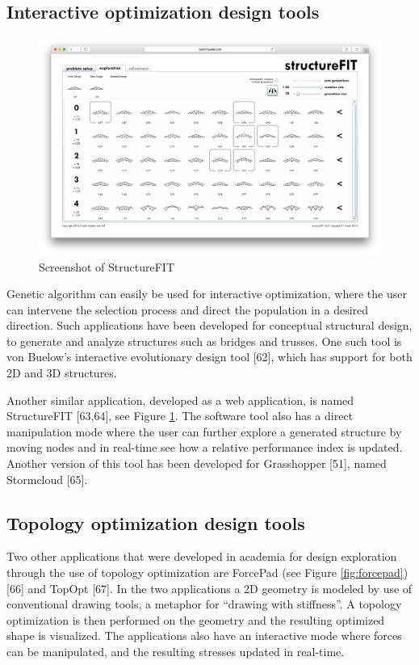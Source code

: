 \subsection{Interactive optimization design tools}

\begin{figure}
  \includegraphics[width=350pt]{graphics/structurefit.png}
  \caption{Screenshot of StructureFIT}
  \label{fig:structurefit}
\end{figure}

Genetic algorithm can easily be used for interactive optimization, where the user can intervene the selection process and direct the population in a desired direction. Such applications have been developed for conceptual structural design, to generate and analyze structures such as bridges and trusses. One such tool is von Buelow’s interactive evolutionary design tool [62], which has support for both 2D and 3D structures.

Another similar application, developed as a web application, is named StructureFIT [63,64], see Figure \ref{fig:structurefit}. The software tool also has a direct manipulation mode where the user can further explore a generated structure by moving nodes and in real-time see how a relative performance index is updated. Another version of this tool has been developed for Grasshopper [51], named Stormcloud [65].

\subsection{Topology optimization design tools}
Two other applications that were developed in academia for design exploration through the use of topology optimization are ForcePad (see Figure \ref{fig:forcepad}) [66] and TopOpt [67]. In the two applications a 2D geometry is modeled by use of conventional drawing tools, a metaphor for “drawing with stiffness”. A topology optimization is then performed on the geometry and the resulting optimized shape is visualized. The applications also have an interactive mode where forces can be manipulated, and the resulting stresses updated in real-time.

